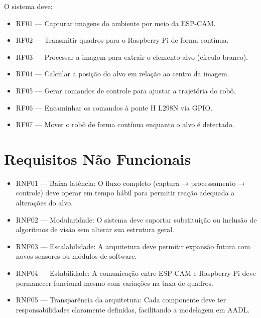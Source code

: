 O sistema deve:
\begin{itemize}
    \item RF01 — Capturar imagens do ambiente por meio da ESP-CAM.
    \item RF02 — Transmitir quadros para o Raspberry Pi de forma contínua.
    \item RF03 — Processar a imagem para extrair o elemento alvo (círculo branco).
    \item RF04 — Calcular a posição do alvo em relação ao centro da imagem.
    \item RF05 — Gerar comandos de controle para ajustar a trajetória do robô.
    \item RF06 — Encaminhar os comandos à ponte H L298N via GPIO.
    \item RF07 — Mover o robô de forma contínua enquanto o alvo é detectado.
\end{itemize}




\section{Requisitos Não Funcionais}

\begin{itemize}
    \item RNF01 — Baixa latência: O fluxo completo (captura → processamento → controle) deve operar em tempo hábil para permitir reação adequada a alterações do alvo.
    \item RNF02 — Modularidade: O sistema deve suportar substituição ou inclusão de algoritmos de visão sem alterar sua estrutura geral.
    \item RNF03 — Escalabilidade: A arquitetura deve permitir expansão futura com novos sensores ou módulos de software.
    \item RNF04 — Estabilidade: A comunicação entre ESP-CAM   e Raspberry Pi deve permanecer funcional mesmo com variações na taxa de quadros.
    \item RNF05 — Transparência da arquitetura: Cada componente deve ter responsabilidades claramente definidas, facilitando a modelagem em AADL.
\end{itemize}



